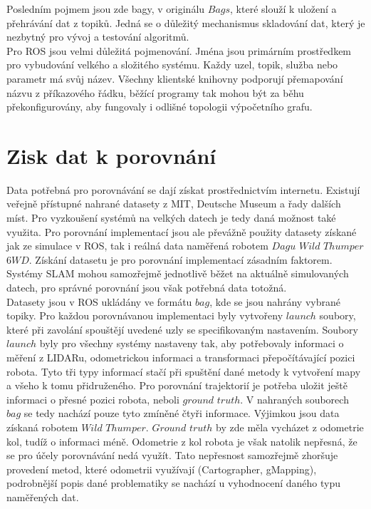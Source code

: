 \documentclass[12pt]{report}
\begin{document}
\indent Posledním pojmem jsou zde bagy, v originálu $Bags$, které slouží k uložení a přehrávání dat z topiků. Jedná se o důležitý mechanismus skladování dat, který je nezbytný pro vývoj a testování algoritmů.\\
\indent Pro ROS jsou velmi důležitá pojmenování. Jména jsou primárním prostředkem pro vybudování velkého a složitého systému. Každy uzel, topik, služba nebo parametr má svůj název. Všechny klientské knihovny podporují přemapování názvu z příkazového řádku, běžící programy tak mohou být za běhu překonfigurovány, aby fungovaly i odlišné topologii výpočetního grafu.\\

\newpage

\section{Zisk dat k porovnání}
Data potřebná pro porovnávání se dají získat prostřednictvím internetu. Existují veřejně přístupné nahrané datasety z MIT, Deutsche Museum a řady dalších míst. Pro vyzkoušení systémů na velkých datech je tedy daná možnost také využita. Pro porovnání implementací jsou ale převážně použity datasety získané jak ze simulace v ROS, tak i reálná data naměřená robotem $Dagu$ $Wild$ $Thumper$ $6WD$. Získání datasetu je pro porovnání implementací zásadním faktorem. Systémy SLAM mohou samozřejmě jednotlivě běžet na aktuálně simulovaných datech, pro správné porovnání jsou však potřebná data totožná.\\ 
\indent Datasety jsou v ROS ukládány ve formátu $bag$, kde se jsou nahrány vybrané topiky. Pro každou porovnávanou implementaci byly vytvořeny $launch$ soubory, které při zavolání spouštějí uvedené uzly se specifikovaným nastavením. Soubory $launch$ byly pro všechny systémy nastaveny tak, aby potřebovaly informaci o měření z LIDARu, odometrickou informaci a transformaci přepočítávající pozici robota. Tyto tři typy informací stačí při spuštění dané metody k vytvoření mapy a všeho k tomu přidruženého. Pro porovnání trajektorií je potřeba uložit ještě informaci o přesné pozici robota, neboli $ground$ $truth$. V nahraných souborech $bag$ se tedy nachází pouze tyto zmíněné čtyři informace. Výjimkou jsou data získaná robotem $Wild$ $Thumper$. $Ground$ $truth$ by zde měla vycházet z odometrie kol, tudíž o informaci méně. Odometrie z kol robota je však natolik nepřesná, že se pro účely porovnávání nedá využít. Tato nepřesnost samozřejmě zhoršuje provedení metod, které odometrii využívají (Cartographer, gMapping), podrobnější popis dané problematiky se nachází u vyhodnocení daného typu naměřených dat.\\
\end{document}
